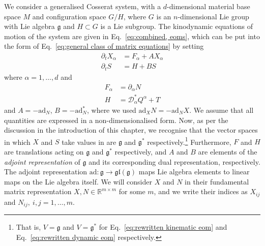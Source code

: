 We consider a generalised Cosserat system, with a $d$-dimensional material base space $M$ and configuration space $G/H$, where $G$ is an $n$-dimensional Lie group with Lie algebra $\mathfrak{g}$ and $H \subset G$ is a Lie subgroup. The kinodynamic equations of motion of the system are given in Eq.~\ref{eq:combined, eoms}, which can be put into the form of Eq.~\ref{eq:general class of matrix equations} by setting
\begin{subequations} \label{eq:rewritten kinodynamic eoms}
	\begin{align}
		\partial_t X_\alpha  & = F_\alpha + A X_\alpha \label{eq:rewritten kinematic eom} \\
		\partial_t S & = H + B S \label{eq:rewritten dynamic eom}
	\end{align}
\end{subequations}
where $\alpha = 1, \dots, d$ and
\begin{subequations} \label{eq:F H defs}
	\begin{align}
		F_\alpha & = \partial_\alpha N \\
		H & = \mathcal{D}^*_\alpha Q^\alpha + T
	\end{align}
\end{subequations}
and $A = - \text{ad}_N$, $B = - \text{ad}^*_N$, where we used $\text{ad}_X N = - \text{ad}_N X$. We assume that all quantities are expressed in a non-dimensionalised form. Now, as per the discussion in the introduction of this chapter, we recognise that the vector spaces in which $X$ and $S$ take values in are $\mathfrak{g}$ and $\mathfrak{g}^*$ respectively.\footnote{That is, $V = \mathfrak{g}$ and $V = \mathfrak{g}^*$ for Eq.~\ref{eq:rewritten kinematic eom} and Eq.~\ref{eq:rewritten dynamic eom} respectively.} Furthermore, $F$ and $H$ are translations acting on  $\mathfrak{g}$ and $\mathfrak{g}^*$ respectively, and $A$ and $B$ are elements of the \textit{adjoint representation} of $\mathfrak{g}$ and its corresponding dual representation, respectively. The adjoint representation $\text{ad} : \mathfrak{g} \to \mathfrak{gl}(\mathfrak{g})$ maps Lie algebra elements to linear maps on the Lie algebra itself. We will consider $X$ and $N$ in their fundamental matrix representation $X,N \in \mathbb{R}^{m \times m}$ for some $m$, and we write their indices as $X_{ij}$ and $N_{ij},\ i,j=1,\dots, m$.

